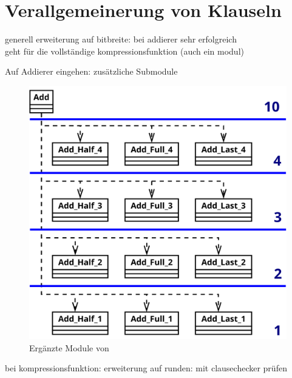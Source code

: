\section{Verallgemeinerung von Klauseln}
\label{sec:ana:generalize}

generell erweiterung auf bitbreite: bei addierer sehr erfolgreich\\
geht für die vollständige kompressionsfunktion (auch ein modul)

Auf Addierer eingehen: zusätzliche Submodule
\begin{figure}[!h]
  \centering
  \includegraphics[scale=0.265]{images/module_add}
  \caption{Ergänzte Module von }
  \label{fig:sha256_module_add}
\end{figure}


bei kompressionsfunktion: erweiterung auf runden: mit clausechecker prüfen

